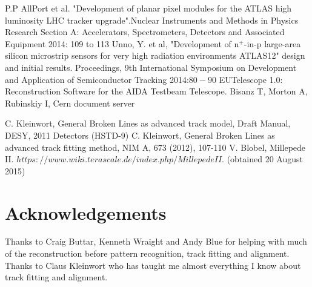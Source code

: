 \documentclass[a0,portrait]{a0poster}
\begin{document}
\begin{multicols}{2}
\begin{thebibliography}{9}
	 P.P AllPort et al. "Development of planar pixel modules for the ATLAS high luminosity LHC tracker upgrade".Nuclear Instruments and Methods in Physics Research Section A: Accelerators, Spectrometers, Detectors and Associated Equipment 2014: 109 to 113
	 Unno, Y. et al, "Development of n$^+$-in-p large-area silicon microstrip sensors for very high radiation environments  ATLAS12" design and initial results. Proceedings, 9th International Symposium on Development and Application of Semiconductor Tracking 2014:$80-90$ 
 EUTelescope 1.0: Reconstruction Software for the AIDA Testbeam Telescope. Bisanz T, Morton A, Rubinskiy I, Cern document server

	  C. Kleinwort, General Broken Lines as advanced track model, Draft Manual, DESY, 2011
                        Detectors (HSTD-9)
	  C. Kleinwort, General Broken Lines as advanced track fitting method, NIM A, 673 (2012), 107-110
	 V. Blobel, Millepede II. $https://www.wiki.terascale.de/index.php/MillepedeII$. (obtained 20 August 2015)
\end{thebibliography}

\section*{Acknowledgements}
Thanks to Craig Buttar, Kenneth Wraight and Andy Blue for helping with much of the reconstruction before pattern recognition, track fitting and alignment. Thanks to Claus Kleinwort who has taught me almost everything I know about track fitting and alignment. 




\end{multicols}
\end{document}
